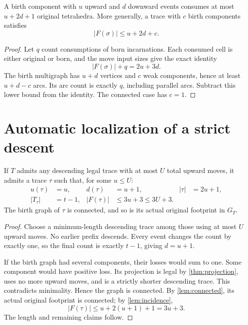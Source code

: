 \begin{lemma}\label{lem:incidence}
A birth component with $u$ upward and $d$ downward events consumes at most
$u+2d+1$ original tetrahedra. More generally, a trace with $c$ birth
components satisfies
\begin{equation}\label{eq:incidence}
 |F(\sigma)|\le u+2d+c.
\end{equation}
\end{lemma}
\begin{proof}
Let $q$ count consumptions of born incarnations. Each consumed cell is
either original or born, and the move input sizes give the exact identity
\[
 |F(\sigma)|+q=2u+3d.
\]
The birth multigraph has $u+d$ vertices and $c$ weak components, hence at
least $u+d-c$ arcs. Its arc count is exactly $q$, including parallel arcs.
Subtract this lower bound from the identity. The connected case has $c=1$.
\end{proof}

\section{Automatic localization of a strict descent}\label{sec:localization}

\begin{theorem}\label{thm:localization}
If $T$ admits any descending legal trace with at most $U$ total upward
moves, it admits a trace $\tau$ such that, for some $u\le U$:
\begin{align}
 u(\tau)&=u,& d(\tau)&=u+1,& |\tau|&=2u+1,\label{eq:counts}\\
 |T_\tau|&=t-1,& |F(\tau)|&\le3u+3\le3U+3.\label{eq:localized}
\end{align}
The birth graph of $\tau$ is connected, and so is its actual original
footprint in $G_T$.
\end{theorem}
\begin{proof}
Choose a minimum-length descending trace among those using at most $U$
upward moves. No earlier prefix descends. Every event changes the count
by exactly one, so the final count is exactly $t-1$, giving $d=u+1$.

If the birth graph had several components, their losses would sum to one.
Some component would have positive loss. Its projection is legal by
\cref{thm:projection}, uses no more upward moves, and is a strictly shorter
descending trace. This contradicts minimality. Hence the graph is connected.
By \cref{lem:connected}, its actual original footprint is connected; by
\cref{lem:incidence},
\[
 |F(\tau)|\le u+2(u+1)+1=3u+3.
\]
The length and remaining claims follow.
\end{proof}

